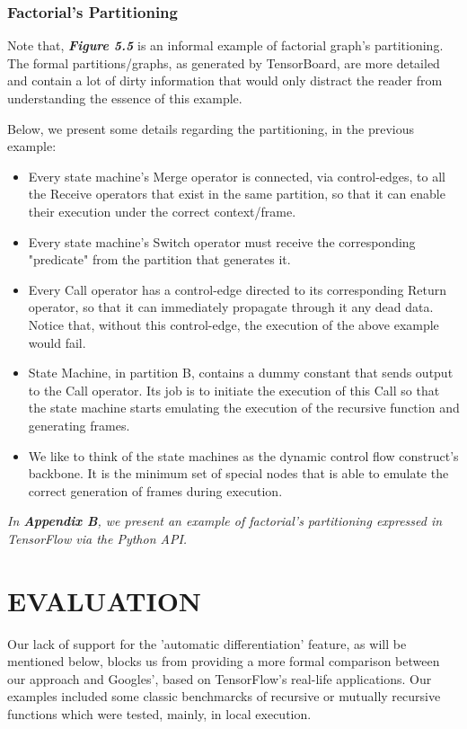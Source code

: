 \documentclass[ack,preface]{dithesis}
\begin{document}
    \subsection{Factorial's Partitioning}

Note that, \textit{\textbf{Figure 5.5}} is an informal example of factorial graph's partitioning. The formal partitions/graphs, as generated by TensorBoard, are more detailed and contain a lot of dirty information that would only distract the reader from understanding the essence of this example.  

Below, we present some details regarding the partitioning, in the previous example:
    
\begin{itemize}
    \item Every state machine's Merge operator is connected, via control-edges, to all the Receive operators that exist in the same partition, so that it can enable their execution under the correct context/frame.
    \item Every state machine's Switch operator must receive the corresponding "predicate" from the partition that generates it.
    \item Every Call operator has a control-edge directed to its corresponding Return operator, so that it can immediately propagate through it any dead data. Notice that, without this control-edge, the execution of the above example would fail.
    \item State Machine, in partition B, contains a dummy constant that sends output to the Call operator. Its job is to initiate the execution of this Call so that the state machine starts emulating the execution of the recursive function and generating frames.
    \item We like to think of  the state machines as the dynamic control flow construct's backbone. It is the minimum set of special nodes that  is able to emulate the correct generation of frames during execution.
    \end{itemize}

\textit{In \textbf{Appendix B}, we present an example of factorial's partitioning expressed in TensorFlow via the Python API.}


\chapter{EVALUATION}

Our lack of support for the 'automatic differentiation' feature, as will be mentioned below, blocks us from providing a more formal comparison between our approach and Googles', based on TensorFlow's real-life applications. 
Our examples included some classic benchmarcks of recursive or mutually recursive functions which were tested, mainly, in local execution.
\end{document}
